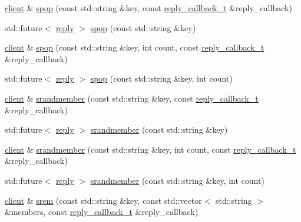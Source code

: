 \begin{DoxyCompactItemize}
\item 
\hyperlink{classcpp__redis_1_1client}{client} \& \hyperlink{classcpp__redis_1_1client_a9a59ca9396d1447ae3a8bb584449e174}{spop} (const std\+::string \&key, const \hyperlink{classcpp__redis_1_1client_a061a1140d36d2eaeda82b09a0bb3f9f2}{reply\+\_\+callback\+\_\+t} \&reply\+\_\+callback)
\item 
std\+::future$<$ \hyperlink{classcpp__redis_1_1reply}{reply} $>$ \hyperlink{classcpp__redis_1_1client_aabd8e3ddf02299eb129af8ad27555282}{spop} (const std\+::string \&key)
\item 
\hyperlink{classcpp__redis_1_1client}{client} \& \hyperlink{classcpp__redis_1_1client_a75a34f373c405999036a1e7e476ff201}{spop} (const std\+::string \&key, int count, const \hyperlink{classcpp__redis_1_1client_a061a1140d36d2eaeda82b09a0bb3f9f2}{reply\+\_\+callback\+\_\+t} \&reply\+\_\+callback)
\item 
std\+::future$<$ \hyperlink{classcpp__redis_1_1reply}{reply} $>$ \hyperlink{classcpp__redis_1_1client_acde89afde549cbe7ead5453fd3635081}{spop} (const std\+::string \&key, int count)
\item 
\hyperlink{classcpp__redis_1_1client}{client} \& \hyperlink{classcpp__redis_1_1client_a69e771fb9562fca08cbf653f8ecb295b}{srandmember} (const std\+::string \&key, const \hyperlink{classcpp__redis_1_1client_a061a1140d36d2eaeda82b09a0bb3f9f2}{reply\+\_\+callback\+\_\+t} \&reply\+\_\+callback)
\item 
std\+::future$<$ \hyperlink{classcpp__redis_1_1reply}{reply} $>$ \hyperlink{classcpp__redis_1_1client_a2a110009cac1bb5063d468df91802395}{srandmember} (const std\+::string \&key)
\item 
\hyperlink{classcpp__redis_1_1client}{client} \& \hyperlink{classcpp__redis_1_1client_a59e0a8886b5f4fa177e93053b9965827}{srandmember} (const std\+::string \&key, int count, const \hyperlink{classcpp__redis_1_1client_a061a1140d36d2eaeda82b09a0bb3f9f2}{reply\+\_\+callback\+\_\+t} \&reply\+\_\+callback)
\item 
std\+::future$<$ \hyperlink{classcpp__redis_1_1reply}{reply} $>$ \hyperlink{classcpp__redis_1_1client_a23913f257f58864d865d70bfe462caa4}{srandmember} (const std\+::string \&key, int count)
\item 
\hyperlink{classcpp__redis_1_1client}{client} \& \hyperlink{classcpp__redis_1_1client_a020849a43f10f56941ef98716440d817}{srem} (const std\+::string \&key, const std\+::vector$<$ std\+::string $>$ \&members, const \hyperlink{classcpp__redis_1_1client_a061a1140d36d2eaeda82b09a0bb3f9f2}{reply\+\_\+callback\+\_\+t} \&reply\+\_\+callback)

\end{DoxyCompactItemize}
